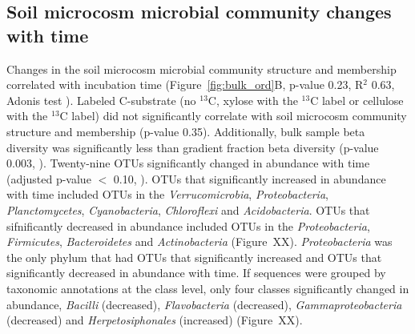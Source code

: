 \subsection{Soil microcosm microbial community changes with time}
Changes in the soil microcosm microbial community structure and membership
correlated with incubation time (Figure~\ref{fig:bulk_ord}B, p-value 0.23,
R$^{2}$ 0.63, Adonis test \citet{Anderson2001a}). Labeled C-substrate (no
$^{13}$C, xylose with the $^{13}$C label or cellulose with the
$^{13}$C label) did not significantly correlate with soil microcosm community
structure and membership (p-value 0.35). Additionally, bulk sample beta
diversity was significantly less than gradient fraction beta diversity (p-value
0.003, \citet{Anderson2006}). Twenty-nine OTUs significantly changed in
abundance with time (adjusted p-value $<$ 0.10, \citet{YBenjamini1995}). OTUs
that significantly increased in abundance with time included OTUs in the
\textit{Verrucomicrobia}, \textit{Proteobacteria}, \textit{Planctomycetes},
\textit{Cyanobacteria}, \textit{Chloroflexi} and \textit{Acidobacteria}. OTUs
that sifnificantly decreased in abundance included OTUs in the
\textit{Proteobacteria}, \textit{Firmicutes}, \textit{Bacteroidetes} and
\textit{Actinobacteria} (Figure~XX).  \textit{Proteobacteria} was the only
phylum that had OTUs that significantly increased and OTUs that significantly
decreased in abundance with time. If sequences were grouped by taxonomic
annotations at the class level, only four classes significantly changed in
abundance, \textit{Bacilli} (decreased), \textit{Flavobacteria} (decreased),
\textit{Gammaproteobacteria} (decreased) and \textit{Herpetosiphonales}
(increased) (Figure~XX). 
